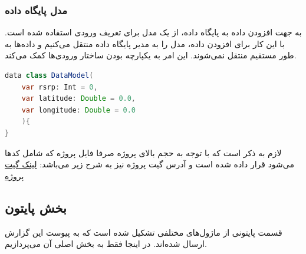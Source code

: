 \subsubsection{مدل پایگاه داده}
به جهت افزودن داده به پایگاه داده، از یک مدل برای تعریف ورودی استفاده شده است. با این کار برای افزودن داده، مدل را به مدیر پایگاه داده منتقل می‌کنیم و داده‌ها به طور مستقیم منتقل نمی‌شوند. این امر به یکپارچه بودن ساختار ورودی‌ها کمک می‌کند.

\begin{lstlisting}[language=Java]
data class DataModel(
	var rsrp: Int = 0,
	var latitude: Double = 0.0,
	var longitude: Double = 0.0
	){
}
\end{lstlisting}

لازم به ذکر است که با توجه به حجم بالای پروژه صرفا فایل  پروژه که شامل کدها می‌شود قرار داده شده است و آدرس گیت پروژه نیز به شرح زیر می‌باشد:
\href{https://github.com/tmoj1428/Fadetect}{لینک گیت پروژه}


\subsection{بخش پایتون}
قسمت پایتونی از ماژول‌های مختلفی تشکیل شده است که به پیوست این گزارش ارسال شده‌اند. در اینجا فقط به بخش اصلی آن می‌پردازیم.	

